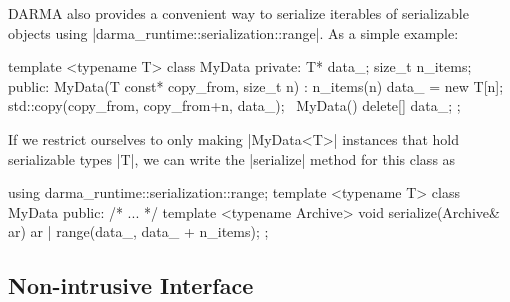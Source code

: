 \gls{DARMA} also provides a convenient way to serialize iterables of serializable
objects using |darma_runtime::serialization::range|.  As a simple example:
\begin{CppCodeNumb}
template <typename T>
class MyData {
  private:
    T* data_;
    size_t n_items;
  public:
    MyData(T const* copy_from, size_t n)
      : n_items(n) {
      data_ = new T[n];
      std::copy(copy_from, copy_from+n, data_);
    }
    ~MyData() { delete[] data_; }
};
\end{CppCodeNumb}
If we restrict ourselves to only making |MyData<T>| instances that hold
serializable types |T|, we can write the |serialize| method for this class as
\begin{CppCodeNumb}
using darma_runtime::serialization::range;
template <typename T>
class MyData {
  public:
    /* ... */
    template <typename Archive>
    void serialize(Archive& ar) {
      ar | range(data_, data_ + n_items);
    }
};
\end{CppCodeNumb}

\subsection{Non-intrusive Interface}

